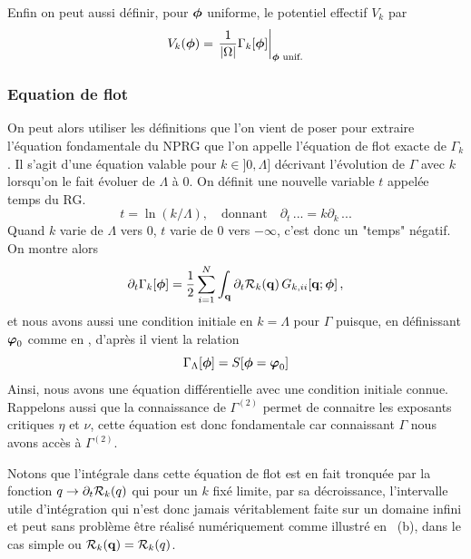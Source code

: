 \documentclass[10pt]{article}
\begin{document}
\begin{multicols}{2}
Enfin on peut aussi définir, pour $\boldsymbol{ \phi}$ uniforme, le potentiel effectif $V_k$ par
\begin{equation}
	V_k(\boldsymbol{ \phi}) = {\left. \frac{1}{|\Omega|} \Gamma_k[\boldsymbol{ \phi}] \right|}_{\boldsymbol{ \phi} \text{ unif.}}
\end{equation}

\vspace*{11pt}


\subsubsection{Equation de flot}

On peut alors utiliser les définitions que l'on vient de poser pour extraire l'équation fondamentale du NPRG que l'on appelle l'équation de flot exacte de $\Gamma_k$. Il s'agit d'une équation valable pour $k \in ]0, \Lambda]$ décrivant l'évolution de $\Gamma$ avec $k$ lorsqu'on le fait évoluer de $\Lambda$ à $0$. On définit une nouvelle variable $t$ appelée temps du RG.
\begin{equation}
	t = \ln(k/\Lambda), \quad \text{donnant} \quad \partial_t \, ... = k\partial_k \, ...
\end{equation}
Quand $k$ varie de $\Lambda$ vers $0$, $t$ varie de $0$ vers $-\infty$, c'est donc un "temps" négatif. On montre alors
\begin{equation}
\partial_t \Gamma_{k}	[\boldsymbol{ \phi}] = \frac{1}{2} \sum\limits_{i=1}^{N} \int_{\bf q} \partial_t \mathcal{R}_k({\bf q}) \, G_{k, ii}[{\bf q}; \boldsymbol{ \phi}] \, ,
	\label{eq:flot}
\end{equation}
et nous avons aussi une condition initiale  en $k = \Lambda$ pour $\Gamma$ puisque, en définissant $\boldsymbol{ \varphi}_0$ comme en , d'après  il vient la relation
\begin{equation}
	\Gamma_\Lambda [\boldsymbol{ \phi}] = S[\boldsymbol{ \phi} = \boldsymbol{ \varphi}_0]
\end{equation}
Ainsi, nous avons une équation différentielle avec une condition initiale connue. Rappelons aussi que la connaissance de $\Gamma^{(2)}$ permet de connaitre les exposants critiques $\eta$ et $\nu$, cette équation est donc fondamentale car connaissant $\Gamma$ nous avons accès à $\Gamma^{(2)}$.

Notons que l'intégrale dans cette équation de flot est en fait tronquée par la fonction $q \to \partial_t\mathcal{R}_k(q)$ qui pour un $k$ fixé limite, par sa décroissance, l'intervalle utile d'intégration qui n'est donc jamais véritablement faite sur un domaine infini et peut sans problème être réalisé numériquement comme illustré en \, (b),  dans le cas simple ou $\mathcal{R}_k({\bf q}) = \mathcal{R}_k(q)$.


\end{multicols}
\end{document}
